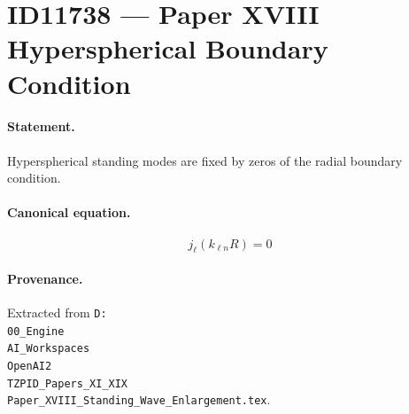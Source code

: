 \section*{ID11738 --- Paper XVIII Hyperspherical Boundary Condition}

\paragraph{Statement.}
Hyperspherical standing modes are fixed by zeros of the radial boundary condition.

\paragraph{Canonical equation.}
\[
j_\ell(k_{\ell n}R)=0
\]

\paragraph{Provenance.}
Extracted from \texttt{D:\\00\_Engine\\AI\_Workspaces\\OpenAI2\\TZPID\_Papers\_XI\_XIX\\Paper\_XVIII\_Standing\_Wave\_Enlargement.tex}.

